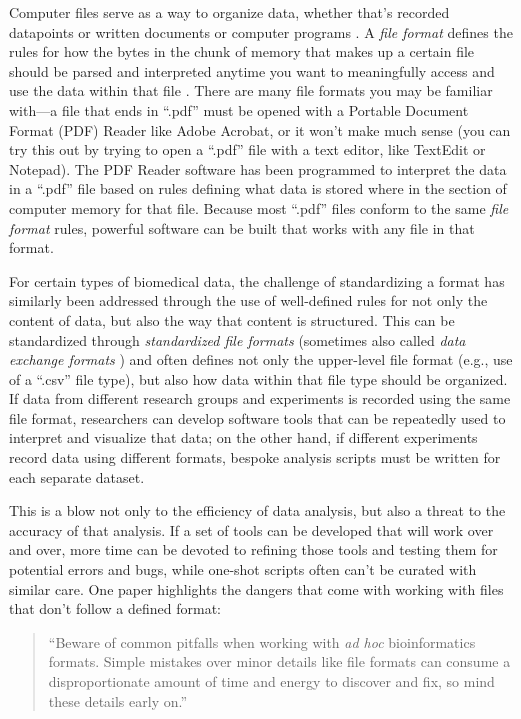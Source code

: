 \documentclass[]{tufte-book}
\begin{document}
Computer files serve as a way to organize data, whether that's recorded
datapoints or written documents or computer programs \citep{kernighan1984unix}. A
\emph{file format} defines the rules for how the bytes in the chunk of memory that
makes up a certain file should be parsed and interpreted anytime you want to
meaningfully access and use the data within that file
\citep{murrell2009introduction}. There are many file formats you may be familiar
with---a file that ends in ``.pdf'' must be opened with a Portable Document Format
(PDF) Reader like Adobe Acrobat, or it won't make much sense (you can try this
out by trying to open a ``.pdf'' file with a text editor, like TextEdit or
Notepad). The PDF Reader software has been programmed to interpret the data in a
``.pdf'' file based on rules defining what data is stored where in the section of
computer memory for that file. Because most ``.pdf'' files conform to the same
\emph{file format} rules, powerful software can be built that works with any file in
that format.

For certain types of biomedical data, the challenge of standardizing a format
has similarly been addressed through the use of well-defined rules for not only
the content of data, but also the way that content is structured. This can be
standardized through \emph{standardized file formats} (sometimes also called \emph{data
exchange formats} \citep{brazma2006standards}) and often defines not only the
upper-level file format (e.g., use of a ``.csv'' file type), but also how data
within that file type should be organized. If data from different research
groups and experiments is recorded using the same file format, researchers can
develop software tools that can be repeatedly used to interpret and visualize
that data; on the other hand, if different experiments record data using
different formats, bespoke analysis scripts must be written for each separate
dataset.

This is a blow not only to the efficiency of data analysis, but also a
threat to the accuracy of that analysis. If a set of tools can be developed that
will work over and over, more time can be devoted to refining those tools and
testing them for potential errors and bugs, while one-shot scripts often can't
be curated with similar care. One paper highlights the dangers that come with
working with files that don't follow a defined format:

\begin{quote}
``Beware of common pitfalls when working with \emph{ad hoc} bioinformatics formats.
Simple mistakes over minor details like file formats can consume a
disproportionate amount of time and energy to discover and fix, so mind these
details early on.'' \citep{buffalo2015bioinformatics}
\end{quote}
\end{document}
